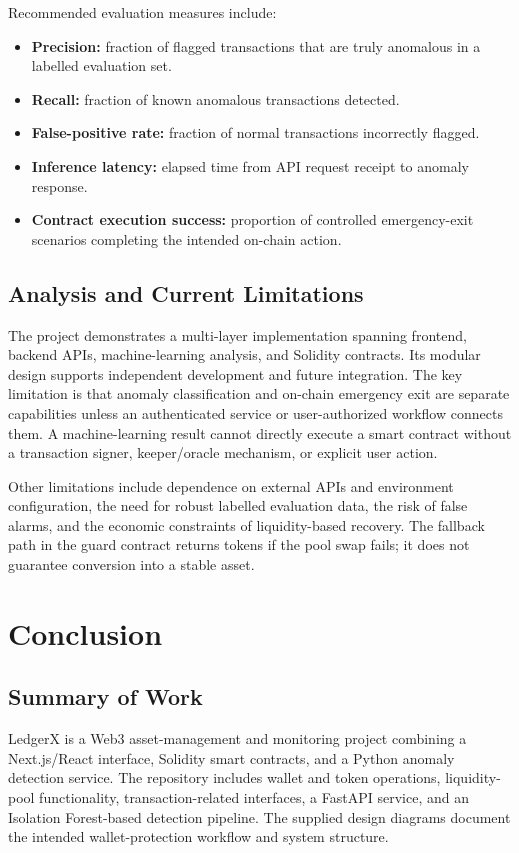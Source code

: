 \documentclass{tietreport}
\begin{document}
Recommended evaluation measures include:
\begin{itemize}
  \item \textbf{Precision:} fraction of flagged transactions that are truly
  anomalous in a labelled evaluation set.
  \item \textbf{Recall:} fraction of known anomalous transactions detected.
  \item \textbf{False-positive rate:} fraction of normal transactions
  incorrectly flagged.
  \item \textbf{Inference latency:} elapsed time from API request receipt to
  anomaly response.
  \item \textbf{Contract execution success:} proportion of controlled
  emergency-exit scenarios completing the intended on-chain action.
\end{itemize}

\section{Analysis and Current Limitations}
The project demonstrates a multi-layer implementation spanning frontend,
backend APIs, machine-learning analysis, and Solidity contracts. Its modular
design supports independent development and future integration. The key
limitation is that anomaly classification and on-chain emergency exit are
separate capabilities unless an authenticated service or user-authorized
workflow connects them. A machine-learning result cannot directly execute
a smart contract without a transaction signer, keeper/oracle mechanism, or
explicit user action.

Other limitations include dependence on external APIs and environment
configuration, the need for robust labelled evaluation data, the risk of
false alarms, and the economic constraints of liquidity-based recovery.
The fallback path in the guard contract returns tokens if the pool swap
fails; it does not guarantee conversion into a stable asset.

\chapter{Conclusion}

\section{Summary of Work}
LedgerX is a Web3 asset-management and monitoring project combining a
Next.js/React interface, Solidity smart contracts, and a Python anomaly
detection service. The repository includes wallet and token operations,
liquidity-pool functionality, transaction-related interfaces, a FastAPI
service, and an Isolation Forest-based detection pipeline. The supplied
design diagrams document the intended wallet-protection workflow and
system structure.
\end{document}
